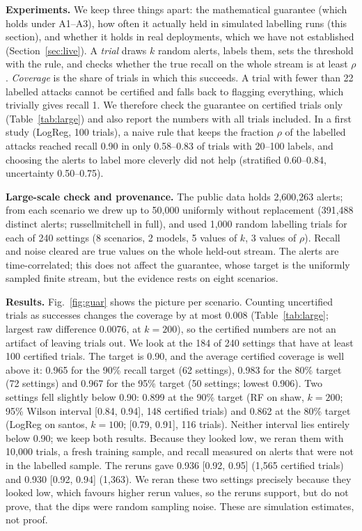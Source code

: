 \documentclass[conference]{IEEEtran}
\begin{document}
\textbf{Experiments.} We keep three things apart: the mathematical guarantee (which holds under
A1--A3), how often it actually held in simulated labelling runs (this section), and whether it
holds in real deployments, which we have not established (Section~\ref{sec:live}). A \emph{trial}
draws $k$ random alerts, labels them, sets the threshold with the rule, and checks whether the true
recall on the whole stream is at least $\rho$. \emph{Coverage} is the share of trials in which
this succeeds. A trial with fewer than 22 labelled attacks cannot be certified and falls back to
flagging everything, which trivially gives recall 1. We therefore check the guarantee on certified
trials only (Table~\ref{tab:large}) and also report the numbers with all trials included. In a first study (LogReg, 100 trials), a naive rule that keeps the fraction $\rho$ of the labelled attacks reached recall 0.90 in only
0.58--0.83 of trials with 20--100 labels, and choosing the alerts to label more cleverly did not help (stratified 0.60--0.84, uncertainty 0.50--0.75).



\textbf{Large-scale check and provenance.} The public data holds 2,600,263 alerts; from each
scenario we drew up to 50,000 uniformly without replacement (391,488 distinct alerts;
russellmitchell in full), and used 1,000 random labelling trials for each of 240 settings (8
scenarios, 2 models, 5 values of $k$, 3 values of $\rho$). Recall and noise cleared are true
values on the whole held-out stream. The alerts are time-correlated; this does not affect the guarantee,
whose target is the uniformly sampled finite stream, but the evidence rests on eight
scenarios.



\textbf{Results.} Fig.~\ref{fig:guar} shows the picture per scenario. Counting uncertified trials
as successes changes the coverage by at most 0.008 (Table~\ref{tab:large}; largest raw difference
0.0076, at $k=200$), so the certified numbers are not an artifact of leaving trials out. We look
at the 184 of 240 settings that have at least 100 certified trials. The target is 0.90, and the
average certified coverage is well above it: 0.965 for the 90\% recall target (62 settings), 0.983
for the 80\% target (72 settings) and 0.967 for the 95\% target (50 settings; lowest 0.906). Two
settings fell slightly below 0.90: 0.899 at the 90\% target (RF on shaw, $k=200$; 95\% Wilson
interval [0.84, 0.94], 148 certified trials) and 0.862 at the 80\% target (LogReg on santos,
$k=100$; [0.79, 0.91], 116 trials). Neither interval lies entirely below 0.90; we keep both results. Because they looked low, we reran them with 10,000 trials, a fresh training
sample, and recall measured on alerts that were not in the labelled sample. The reruns gave 0.936
[0.92, 0.95] (1,565 certified trials) and 0.930 [0.92, 0.94] (1,363). We reran these two settings
precisely because they looked low, which favours higher rerun values, so the reruns support, but
do not prove, that the dips were random sampling noise. These are simulation estimates, not proof.
\end{document}
